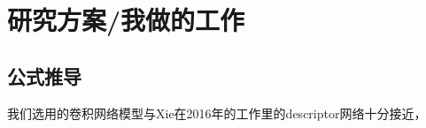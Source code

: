\chapter{研究方案/我做的工作}

\section{公式推导} \label{formulaDeduction}

我们选用的卷积网络模型与Xie在2016年的工作\cite{xie2016cooperative}里的descriptor网络十分接近，
